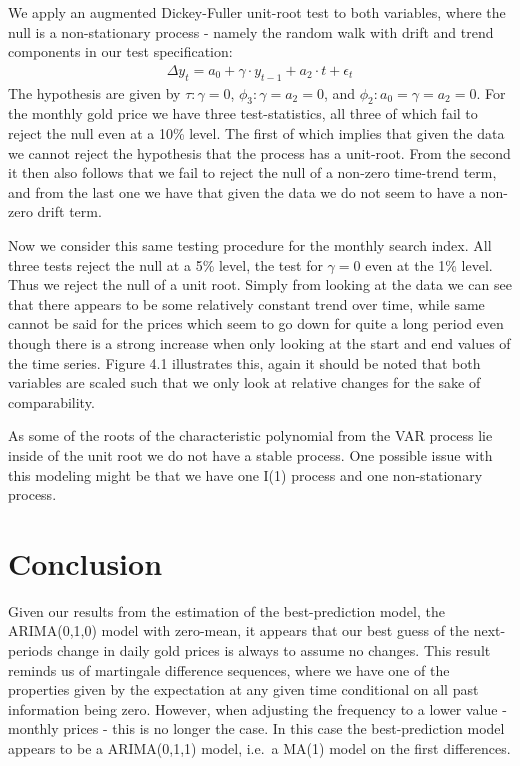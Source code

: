 \documentclass[a4paper]{article}
\theoremstyle{definition}
\begin{document}
We apply an augmented Dickey-Fuller unit-root test to both variables, where the null is a non-stationary process - namely the random walk with drift and trend components in our test specification:
	\begin{align*}
	 \Delta y_t = a_0 + \gamma \cdot y_{t-1} + a_2 \cdot t + \epsilon_{t}
	\end{align*}
The hypothesis are given by $\tau: \gamma = 0$, $\phi_3: \gamma = a_2 = 0$, and $\phi_2: a_0 = \gamma = a_2 = 0$. For the monthly gold price we have three test-statistics, all three of which fail to reject the null even at a 10\% level. The first of which implies that given the data we cannot reject the hypothesis that the process has a unit-root. From the second it then also follows that we fail to reject the null of a non-zero time-trend term, and from the last one we have that given the data we do not seem to have a non-zero drift term.

Now we consider this same testing procedure for the monthly search index. All three tests reject the null at a 5\% level, the test for $\gamma = 0$ even at the 1\% level. Thus we reject the null of a unit root. Simply from looking at the data we can see that there appears to be some relatively constant trend over time, while same cannot be said for the prices which seem to go down for quite a long period even though there is a strong increase when only looking at the start and end values of the time series. Figure 4.1 illustrates this, again it should be noted that both variables are scaled such that we only look at relative changes for the sake of comparability.



As some of the roots of the characteristic polynomial from the VAR process lie inside of the unit root we do not have a stable process. One possible issue with this modeling might be that we have one I(1) process and one non-stationary process. 
\section{Conclusion}
Given our results from the estimation of the best-prediction model, the ARIMA(0,1,0) model with zero-mean, it appears that our best guess of the next-periods change in daily gold prices is always to assume no changes. This result reminds us of martingale difference sequences, where we have one of the properties given by the expectation at any given time conditional on all past information being zero. However, when adjusting the frequency to a lower value - monthly prices - this is no longer the case. In this case the best-prediction model appears to be a ARIMA(0,1,1) model, i.e.\ a MA(1) model on the first differences. 
%
%
%
%
%
%
%
%
\newpage
{}
\printbibliography
\end{document}
